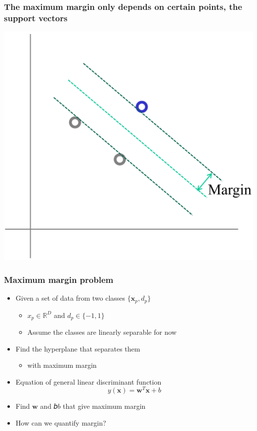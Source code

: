 \documentclass[12pt,notes,mathserif]{beamer}
\begin{document}
\begin{frame}[c]
\frametitle{The maximum margin only depends on certain points, the support vectors}
\begin{center}
\includegraphics[width=0.7\linewidth]{fig8/lec810.jpg}
\end{center}
\end{frame}


\begin{frame}[c]
\frametitle{Maximum margin problem}
\begin{itemize}
\item  Given a set of data from two classes $\{\bm{x}_p,d_p\}$
		\begin{itemize}
		\item $x_p\in \mathbb{R}^D$ and $d_p\in\{-1,1\}$
		\item Assume the classes are linearly separable for now
		\end{itemize}
\item Find the hyperplane that separates them
		\begin{itemize}
		\item with maximum margin
		\end{itemize}
\item Equation of general linear discriminant function
\[y(\bm{x})=\bm{w}^T\bm{x}+b\]

\item Find $\bm{w}$ and 𝑏$b$ that give maximum margin
\item How can we quantify margin?
\end{itemize}

\end{frame}
\end{document}
